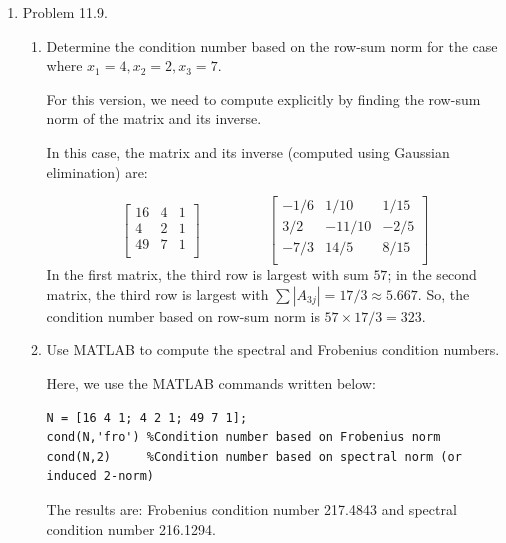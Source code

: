 \documentclass[12pt]{amsart}
\begin{document}
\begin{enumerate}
\vfill
\pagebreak


\item Problem 11.9.

\vspace{5mm}

\begin{enumerate}
\item Determine the condition number based on the row-sum
norm for the case where $x_1 = 4, x_2 = 2, x_3 = 7$.

\vspace{1cm}

For this version, we need to compute explicitly by finding the
row-sum norm of the matrix and its inverse.

In this case, the matrix and its inverse (computed using Gaussian
elimination) are:

\[
\left[\begin{array}{ccc}
16 & 4 & 1 \\
4 & 2 & 1 \\
49 & 7 & 1 \\
\end{array} \right] \hspace{2cm}
\left[\begin{array}{ccc}
-1/6 & 1/10 & 1/15 \\
3/2 & -11/10 & -2/5 \\
-7/3 & 14/5 & 8/15 \\
\end{array} \right]
\]
In the first matrix, the third row is largest with sum $57$; in the
second matrix, the third row is largest with 
$\sum |A_{3j}| = 17/3 \approx 5.667$. So, the condition number
 based on row-sum norm is $57 \times 17/3 = 323$.

\vspace{5mm}

\item Use MATLAB to compute the spectral and Frobenius condition numbers.

\vspace{1cm}
Here, we use the MATLAB commands written below:
\begin{verbatim}
N = [16 4 1; 4 2 1; 49 7 1];
cond(N,'fro') %Condition number based on Frobenius norm
cond(N,2)     %Condition number based on spectral norm (or induced 2-norm)
\end{verbatim}
The results are: Frobenius condition number 217.4843 and spectral
condition number 216.1294.
\end{enumerate}


\end{enumerate}
\end{document}
